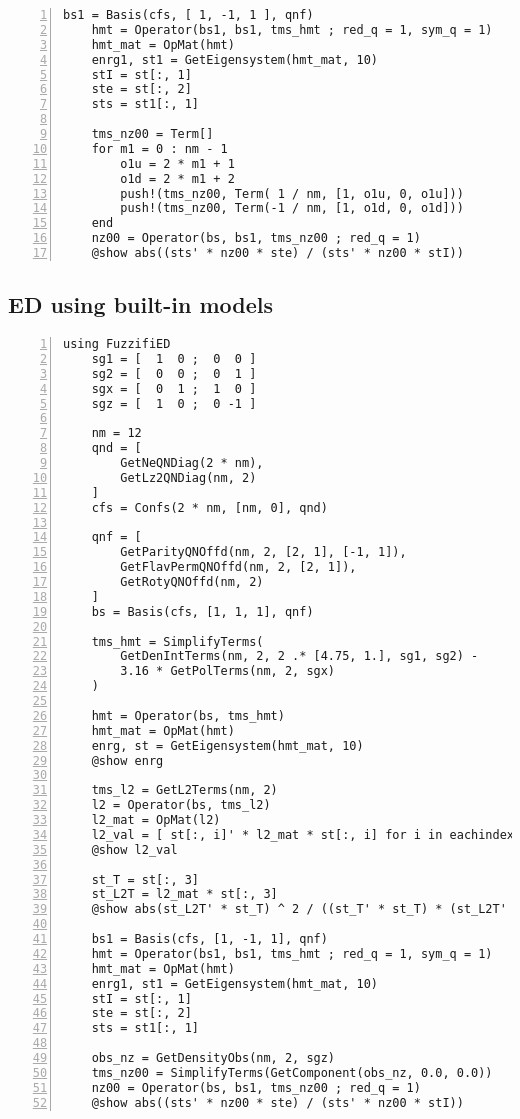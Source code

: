 \documentclass{timesjhep}
\begin{document}
\begin{lstlisting}[numbers=left]
    bs1 = Basis(cfs, [ 1, -1, 1 ], qnf) 
    hmt = Operator(bs1, bs1, tms_hmt ; red_q = 1, sym_q = 1) 
    hmt_mat = OpMat(hmt)
    enrg1, st1 = GetEigensystem(hmt_mat, 10)
    stI = st[:, 1] 
    ste = st[:, 2] 
    sts = st1[:, 1]

    tms_nz00 = Term[]
    for m1 = 0 : nm - 1
        o1u = 2 * m1 + 1
        o1d = 2 * m1 + 2
        push!(tms_nz00, Term( 1 / nm, [1, o1u, 0, o1u]))
        push!(tms_nz00, Term(-1 / nm, [1, o1d, 0, o1d]))
    end
    nz00 = Operator(bs, bs1, tms_nz00 ; red_q = 1)
    @show abs((sts' * nz00 * ste) / (sts' * nz00 * stI))
\end{lstlisting}

\subsection{ED using built-in models}
\label{app:code_ed2}

\begin{lstlisting}[numbers=left]
    using FuzzifiED
    sg1 = [  1  0 ;  0  0 ]
    sg2 = [  0  0 ;  0  1 ]
    sgx = [  0  1 ;  1  0 ]
    sgz = [  1  0 ;  0 -1 ]

    nm = 12
    qnd = [ 
        GetNeQNDiag(2 * nm), 
        GetLz2QNDiag(nm, 2) 
    ]
    cfs = Confs(2 * nm, [nm, 0], qnd)

    qnf = [ 
        GetParityQNOffd(nm, 2, [2, 1], [-1, 1]), 
        GetFlavPermQNOffd(nm, 2, [2, 1]), 
        GetRotyQNOffd(nm, 2) 
    ]
    bs = Basis(cfs, [1, 1, 1], qnf)

    tms_hmt = SimplifyTerms(
        GetDenIntTerms(nm, 2, 2 .* [4.75, 1.], sg1, sg2) - 
        3.16 * GetPolTerms(nm, 2, sgx) 
    )

    hmt = Operator(bs, tms_hmt)
    hmt_mat = OpMat(hmt)
    enrg, st = GetEigensystem(hmt_mat, 10)
    @show enrg

    tms_l2 = GetL2Terms(nm, 2)
    l2 = Operator(bs, tms_l2)
    l2_mat = OpMat(l2)
    l2_val = [ st[:, i]' * l2_mat * st[:, i] for i in eachindex(enrg)]
    @show l2_val

    st_T = st[:, 3]
    st_L2T = l2_mat * st[:, 3]
    @show abs(st_L2T' * st_T) ^ 2 / ((st_T' * st_T) * (st_L2T' * st_L2T))

    bs1 = Basis(cfs, [1, -1, 1], qnf)
    hmt = Operator(bs1, bs1, tms_hmt ; red_q = 1, sym_q = 1) 
    hmt_mat = OpMat(hmt)
    enrg1, st1 = GetEigensystem(hmt_mat, 10)
    stI = st[:, 1] 
    ste = st[:, 2] 
    sts = st1[:, 1]

    obs_nz = GetDensityObs(nm, 2, sgz)
    tms_nz00 = SimplifyTerms(GetComponent(obs_nz, 0.0, 0.0))
    nz00 = Operator(bs, bs1, tms_nz00 ; red_q = 1) 
    @show abs((sts' * nz00 * ste) / (sts' * nz00 * stI))
\end{lstlisting}
\end{document}
